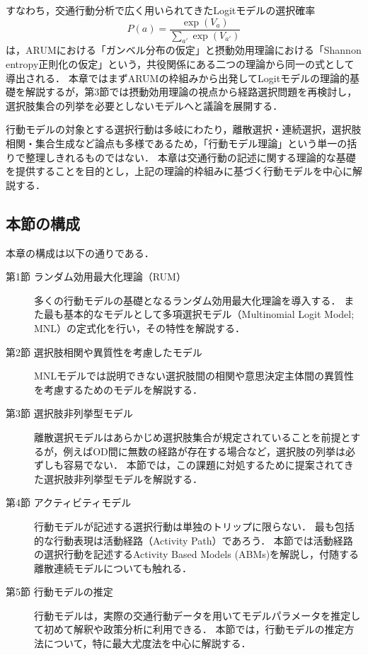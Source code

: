 すなわち，交通行動分析で広く用いられてきたLogitモデルの選択確率
\begin{equation*}\label{eq:logit_choice_model}
  P(a) = \frac{\exp(V_a)}{\sum_{a'}\exp(V_{a'})}
\end{equation*}
は，ARUMにおける「ガンベル分布の仮定」と摂動効用理論における「Shannon entropy正則化の仮定」という，共役関係にある二つの理論から同一の式として導出される．
本章ではまずARUMの枠組みから出発してLogitモデルの理論的基礎を解説するが，第3節では摂動効用理論の視点から経路選択問題を再検討し，選択肢集合の列挙を必要としないモデルへと議論を展開する．

行動モデルの対象とする選択行動は多岐にわたり，離散選択・連続選択，選択肢相関・集合生成など論点も多様であるため，「行動モデル理論」という単一の括りで整理しきれるものではない．
本章は交通行動の記述に関する理論的な基礎を提供することを目的とし，上記の理論的枠組みに基づく行動モデルを中心に解説する．

\subsection*{本節の構成}

本章の構成は以下の通りである．
\begin{description}
  \item[第1節 ランダム効用最大化理論（RUM）]
   多くの行動モデルの基礎となるランダム効用最大化理論を導入する．
   また最も基本的なモデルとして多項選択モデル（Multinomial Logit Model; MNL）の定式化を行い，その特性を解説する．

  \item[第2節 選択肢相関や異質性を考慮したモデル] 
  MNLモデルでは説明できない選択肢間の相関や意思決定主体間の異質性を考慮するためのモデルを解説する．

  \item[第3節 選択肢非列挙型モデル]
  離散選択モデルはあらかじめ選択肢集合が規定されていることを前提とするが，例えばOD間に無数の経路が存在する場合など，選択肢の列挙は必ずしも容易でない．
  本節では，この課題に対処するために提案されてきた選択肢非列挙型モデルを解説する．
  
  \item[第4節 アクティビティモデル]
  行動モデルが記述する選択行動は単独のトリップに限らない．
  最も包括的な行動表現は活動経路（Activity Path）であろう．
  本節では活動経路の選択行動を記述するActivity Based Models (ABMs)を解説し，付随する離散連続モデルについても触れる．
  
  \item [第5節 行動モデルの推定]
  行動モデルは，実際の交通行動データを用いてモデルパラメータを推定して初めて解釈や政策分析に利用できる．
  本節では，行動モデルの推定方法について，特に最大尤度法を中心に解説する．
\end{description}
